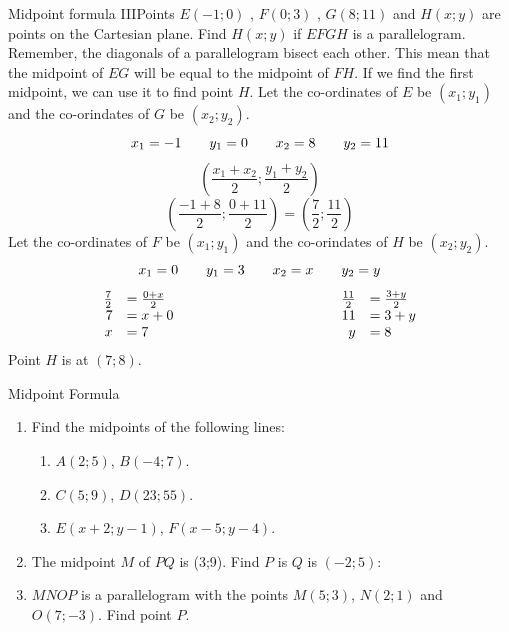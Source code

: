 \begin{wex}{Midpoint formula III}{Points $E(-1;0)$ , $F(0;3)$ , $G(8;11)$ and $H(x;y)$ are points on the Cartesian plane. Find $H(x;y)$ if $EFGH$ is a parallelogram.}{
Remember, the diagonals of a parallelogram bisect each other. This mean that the midpoint of $EG$
will be equal to the midpoint of $FH$. If we find the first midpoint, we can use it to find point $H$.
Let the co-ordinates of $E$ be $(x_1;y_1)$ and the co-orindates of $G$ be $(x_2;y_2)$.
\begin{equation*}
 x_1=-1 \hskip2em y_1=0 \hskip2em x_2=8 \hskip2em y_2=11
\end{equation*}
\begin{equation*}
 (\frac{x_1+x_2}{2}; \frac{y_1+y_2}{2})
\end{equation*}
\begin{equation*}
  (\frac{-1+8}{2}; \frac{0+11}{2}) = (\frac{7}{2};\frac{11}{2})
\end{equation*}
Let the co-ordinates of $F$ be $(x_1;y_1)$ and the co-orindates of $H$ be $(x_2;y_2)$.
 \begin{equation*}
  x_1=0 \hskip2em y_1=3 \hskip2em x_2=x \hskip2em y_2=y
 \end{equation*}
\begin{equation*}
 \begin{array}{rllrl}
  \frac{7}{2}&=\frac{0+x}{2}&\hskip10em&\frac{11}{2}&=\frac{3+y}{2}\\
  7&=x+0&&11&=3+y\\
  x&=7&&y&=8\\
 \end{array}
\end{equation*}
Point $H$ is at $(7;8)$.
}
\end{wex}

\begin{exercises}{Midpoint Formula}
 \begin{enumerate}
  \item Find the midpoints of the following lines:
  \begin{enumerate}
   \item $A(2;5)$, $B(-4;7)$.
   \item $C(5;9)$, $D(23;55)$.
   \item $E(x+2;y-1)$, $F(x-5;y-4)$.
  \end{enumerate}
  
  \item The midpoint $M$ of $PQ$ is (3;9). Find $P$ is $Q$ is $(-2;5)$:

  \item $MNOP$ is a parallelogram with the points $M(5;3)$, $N(2;1)$ and $O(7;-3)$. Find point $P$.
 \end{enumerate}
\end{exercises}    
  \label{m39167*fs-id5760712}
